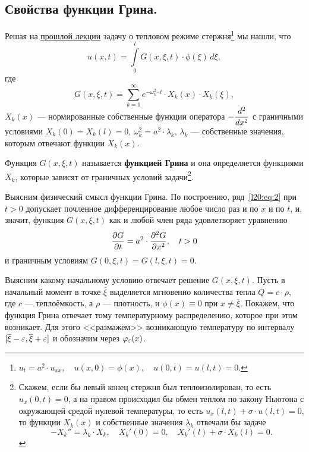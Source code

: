 	\chapter{}
\label{lecture20}
\section{Свойства функции Грина.}
\label{lecture20section1}
Решая на \hyperref[lecture19]{прошлой лекции} задачу о тепловом режиме стержня\footnote[1]{$u_t=a^2\cdot u_{xx},\quad u(x,0)=\phi(x),\quad u(0,t)=u(l,t)=0$.} мы нашли, что 
\begin{equation}\label{l20:eq:1}
	u(x,t)=\int\limits_0^l G(x,\xi,t)\cdot\phi(\xi)\,d\xi,
\end{equation} 
где 
\begin{equation}\label{l20:eq:2}
	G(x,\xi,t)=\sum\limits_{k=1}^{\infty}e^{-\omega_k^2\cdot t}\cdot X_k(x)\cdot X_k(\xi),
\end{equation}
$X_k(x)$ --- нормированные собственные функции оператора $\displaystyle -\frac{d^2}{dx^2}$ с граничными условиями $X_k(0)=X_k(l)=0$, $\omega_k^2=a^2\cdot \lambda_k$, $\lambda_k$ --- собственные значения, которым отвечают функции $X_k(x)$.

\begin{_definition}
	Функция $G(x,\xi,t)$ называется \textbf{функцией Грина} и она определяется функциями $X_k$, которые зависят от граничных условий задачи\footnote{Скажем, если бы левый конец стержня был теплоизолирован, то есть $u_x(0,t)=0$, а на правом происходил бы обмен теплом по закону Ньютона с окружающей средой нулевой температуры, то есть $u_x(l,t)+\sigma\cdot u(l,t)=0$, то функции $X_k(x)$ и собственные значения $\lambda_k$ отвечали бы задаче
		\begin{equation*}
			-X_k''=\lambda_k\cdot X_k,\quad X_k'(0)=0,\quad X_k'(l)+\sigma\cdot X_k(l)=0.
	\end{equation*}}.
\end{_definition}

Выясним физический смысл функции Грина. По построению, ряд~\eqref{l20:eq:2} при $t>0$ допускает почленное дифференцирование любое число раз и по $x$ и по $t$, и, значит, функция $G(x,\xi,t)$ как и любой член ряда удовлетворяет уравнению
\begin{equation*}
	\frac{\partial G}{\partial t}=a^2\cdot\frac{\partial^2G}{\partial x^2},\quad t>0
\end{equation*}
и граничным условиям $G(0,\xi,t)=G(l,\xi,t)=0$.

Выясним какому начальному условию отвечает решение $G(x,\xi,t)$. Пусть в начальный момент в точке $\overline{\xi}$ выделяется мгновенно количества тепла $Q=c\cdot\rho$, где $c$ --- теплоёмкость, а $\rho$ --- плотность, и $\phi(x)\equiv0$ при $x\neq\overline{\xi}$. Покажем, что функция Грина отвечает тому температурному распределению, которое при этом возникает. Для этого <<размажем>> возникающую температуру по интервалу $[\overline{\xi}-\varepsilon,\overline{\xi}+\varepsilon]$ и обозначим через $\varphi_{\varepsilon}(x)$.



